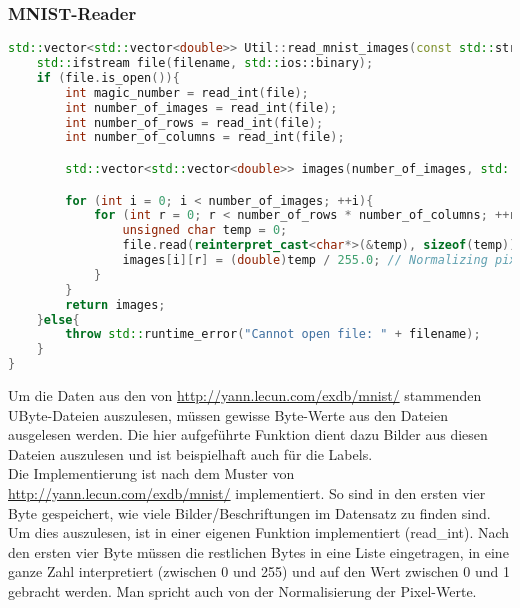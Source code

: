 \subsubsection{MNIST-Reader}
\label{sec:RealMNISTReaderCode}
\begin{lstlisting}[language=C++]
std::vector<std::vector<double>> Util::read_mnist_images(const std::string &filename){
    std::ifstream file(filename, std::ios::binary);
    if (file.is_open()){
        int magic_number = read_int(file);
        int number_of_images = read_int(file);
        int number_of_rows = read_int(file);
        int number_of_columns = read_int(file);

        std::vector<std::vector<double>> images(number_of_images, std::vector<double>(number_of_rows * number_of_columns));

        for (int i = 0; i < number_of_images; ++i){
            for (int r = 0; r < number_of_rows * number_of_columns; ++r){
                unsigned char temp = 0;
                file.read(reinterpret_cast<char*>(&temp), sizeof(temp));
                images[i][r] = (double)temp / 255.0; // Normalizing pixel values to [0, 1]
            }
        }
        return images;
    }else{
        throw std::runtime_error("Cannot open file: " + filename);
    }
}
\end{lstlisting}
Um die Daten aus den von \url{http://yann.lecun.com/exdb/mnist/} stammenden UByte-Dateien auszulesen, müssen gewisse Byte-Werte aus den Dateien ausgelesen werden. Die hier aufgeführte Funktion dient dazu Bilder aus diesen Dateien auszulesen und ist beispielhaft auch für die Labels.
\\
Die Implementierung ist nach dem Muster von \url{http://yann.lecun.com/exdb/mnist/} implementiert. So sind in den ersten vier Byte gespeichert, wie viele Bilder/Beschriftungen im Datensatz zu finden sind. Um dies auszulesen, ist in einer eigenen Funktion implementiert (read\_int). Nach den ersten vier Byte müssen die restlichen Bytes in eine Liste eingetragen, in eine ganze Zahl interpretiert (zwischen 0 und 255) und auf den Wert zwischen 0 und 1 gebracht werden. Man spricht auch von der Normalisierung der Pixel-Werte.

